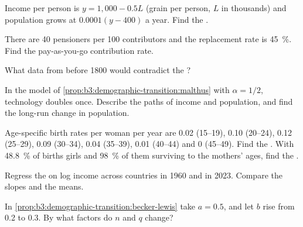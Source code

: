 \begin{exercise}[$\star$]\label{exo:b3:demographic-transition:2}
Income per person is $y = 1{,}000 - 0.5L$ (grain per person, $L$ in thousands) and population grows at $0.0001(y - 400)$ a year. Find
the .
\end{exercise}

\begin{exercise}[$\star$]\label{exo:b3:demographic-transition:3}
There are 40 pensioners per 100 contributors and the replacement rate is 45~\%. Find the pay-as-you-go
contribution rate.
\end{exercise}

\begin{exercise}[$\star$]\label{exo:b3:demographic-transition:4}
What data from before 1800 would contradict the ?
\end{exercise}

\begin{exercise}[$\star\star$]\label{exo:b3:demographic-transition:5}
In the model of \cref{prop:b3:demographic-transition:malthus} with $\alpha = 1/2$, technology doubles once. Describe the paths of income and
population, and find the long-run change in population.
\end{exercise}

\begin{exercise}[$\star\star$]\label{exo:b3:demographic-transition:6}
Age-specific birth rates per woman per year are 0.02 (15--19), 0.10 (20--24), 0.12 (25--29), 0.09 (30--34), 0.04 (35--39), 0.01 (40--44)
and 0 (45--49). Find the . With 48.8~\% of births girls and 98~\% of them surviving to the
mothers' ages, find the .
\end{exercise}

\begin{exercise}[$\star\star$]\label{exo:b3:demographic-transition:7}
Regress the  on log income across countries in 1960 and in 2023. Compare
the slopes and the means.
\end{exercise}

\begin{exercise}[$\star\star$]\label{exo:b3:demographic-transition:8}
In \cref{prop:b3:demographic-transition:becker-lewis} take $a = 0.5$, and let $b$ rise from 0.2 to 0.3. By what factors do $n$ and $q$ change?
\end{exercise}

